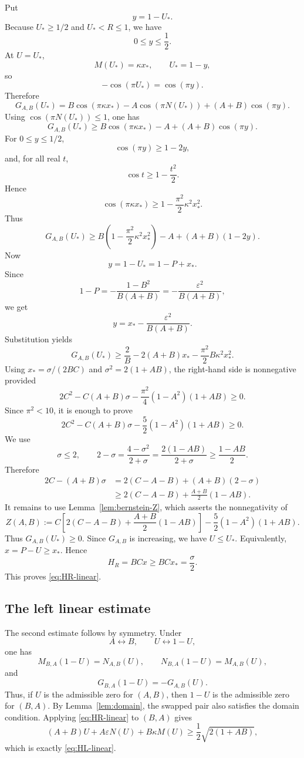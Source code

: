 \documentclass[11pt]{amsart}
\theoremstyle{remark}
\newcommand{\eps}{\varepsilon}
\numberwithin{equation}{section}
\begin{document}
Put
\[
        y=1-U_*.
\]
Because $U_*\geq 1/2$ and $U_*<R\leq 1$, we have
\[
        0\leq y\leq \frac12.
\]
At $U=U_*$,
\[
        M(U_*)=\kappa x_*,
        \qquad
        U_*=1-y,
\]
so
\[
        -\cos(\pi U_*)=\cos(\pi y).
\]
Therefore
\[
        G_{A,B}(U_*)
        =B\cos(\pi\kappa x_*)-A\cos(\pi N(U_*))+(A+B)\cos(\pi y).
\]
Using $\cos(\pi N(U_*))\leq 1$, one has
\[
        G_{A,B}(U_*)
        \geq
        B\cos(\pi\kappa x_*)-A+(A+B)\cos(\pi y).
\]
For $0\leq y\leq 1/2$,
\[
        \cos(\pi y)\geq 1-2y,
\]
and, for all real $t$,
\[
        \cos t\geq 1-\frac{t^2}{2}.
\]
Hence
\[
        \cos(\pi\kappa x_*)\geq 1-\frac{\pi^2}{2}\kappa^2 x_*^2.
\]
Thus
\[
        G_{A,B}(U_*)
        \geq
        B\left(1-\frac{\pi^2}{2}\kappa^2 x_*^2\right)
        -A+(A+B)(1-2y).
\]
Now
\[
        y=1-U_*=1-P+x_*.
\]
Since
\[
        1-P=-\frac{1-B^2}{B(A+B)}=-\frac{\eps^2}{B(A+B)},
\]
we get
\[
        y=x_*-\frac{\eps^2}{B(A+B)}.
\]
Substitution yields
\[
        G_{A,B}(U_*)
        \geq
        \frac2B-2(A+B)x_*-\frac{\pi^2}{2}B\kappa^2 x_*^2.
\]
Using $x_*=\sigma/(2BC)$ and $\sigma^2=2(1+AB)$, the right-hand side is nonnegative provided
\[
        2C^2-C(A+B)\sigma-
        \frac{\pi^2}{4}(1-A^2)(1+AB)\geq 0.
\]
Since $\pi^2<10$, it is enough to prove
\[
        2C^2-C(A+B)\sigma-
        \frac52(1-A^2)(1+AB)\geq 0.
\]
We use
\[
        \sigma\leq 2,
        \qquad
        2-\sigma=
        \frac{4-\sigma^2}{2+
        \sigma}
        =\frac{2(1-AB)}{2+
        \sigma}
        \geq \frac{1-AB}{2}.
\]
Therefore
\[
\begin{aligned}
        2C-(A+B)\sigma
        &=2(C-A-B)+(A+B)(2-
        \sigma)        \\
        &\geq 2(C-A-B)+\frac{A+B}{2}(1-AB).
\end{aligned}
\]
It remains to use Lemma~\ref{lem:bernstein-Z}, which asserts the nonnegativity of
\[
        Z(A,B)
        :=C\left[2(C-A-B)+\frac{A+B}{2}(1-AB)\right]
        -\frac52(1-A^2)(1+AB).
\]
Thus $G_{A,B}(U_*)\geq 0$. Since $G_{A,B}$ is increasing, we have $U\leq U_*$. Equivalently, $x=P-U\geq x_*$. Hence
\[
        H_R=BCx\geq BCx_*=
        \frac\sigma2.
\]
This proves \eqref{eq:HR-linear}.

\subsection{The left linear estimate}

The second estimate follows by symmetry. Under
\[
        A\leftrightarrow B,
        \qquad
        U\leftrightarrow 1-U,
\]
one has
\[
        M_{B,A}(1-U)=N_{A,B}(U),
        \qquad
        N_{B,A}(1-U)=M_{A,B}(U),
\]
and
\[
        G_{B,A}(1-U)=-G_{A,B}(U).
\]
Thus, if $U$ is the admissible zero for $(A,B)$, then $1-U$ is the admissible zero for $(B,A)$. By Lemma~\ref{lem:domain}, the swapped pair also satisfies the domain condition. Applying \eqref{eq:HR-linear} to $(B,A)$ gives
\[
        (A+B)U+A\eps N(U)+B\kappa M(U)
        \geq \frac12\sqrt{2(1+AB)},
\]
which is exactly \eqref{eq:HL-linear}.
\end{document}
